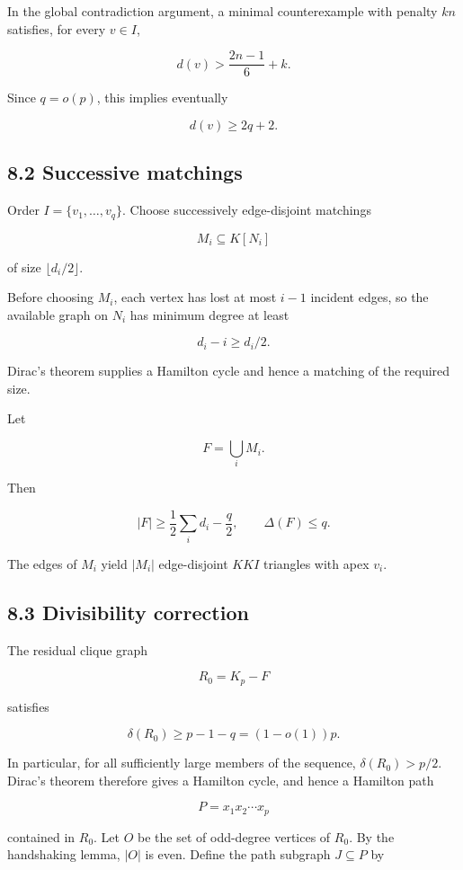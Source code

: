 \documentclass[
  11pt,
]{article}
\begin{document}
In the global contradiction argument, a minimal counterexample with
penalty \(kn\) satisfies, for every \(v\in I\),

\[
d(v)>
\frac{2n-1}{6}+k.
\tag{8.1}
\]

Since \(q=o(p)\), this implies eventually

\[
d(v)\ge2q+2.
\tag{8.2}
\]

\subsection{8.2 Successive matchings}\label{successive-matchings}

Order \(I=\{v_1,\ldots,v_q\}\). Choose successively edge-disjoint
matchings

\[
M_i\subseteq K[N_i]
\]

of size \(\lfloor d_i/2\rfloor\).

Before choosing \(M_i\), each vertex has lost at most \(i-1\) incident
edges, so the available graph on \(N_i\) has minimum degree at least

\[
d_i-i\ge d_i/2.
\]

Dirac's theorem supplies a Hamilton cycle and hence a matching of the
required size.

Let

\[
F=\bigcup_iM_i.
\]

Then

\[
|F|
\ge
\frac12\sum_i d_i-\frac q2,
\qquad
\Delta(F)\le q.
\tag{8.3}
\]

The edges of \(M_i\) yield \(|M_i|\) edge-disjoint \(KKI\) triangles
with apex \(v_i\).

\subsection{8.3 Divisibility correction}\label{divisibility-correction}

The residual clique graph

\[
R_0=K_p-F
\]

satisfies

\[
\delta(R_0)
\ge
p-1-q
=(1-o(1))p.
\tag{8.4}
\]

In particular, for all sufficiently large members of the sequence,
\(\delta(R_0)>p/2\). Dirac's theorem therefore gives a Hamilton cycle,
and hence a Hamilton path

\[
P=x_1x_2\cdots x_p
\]

contained in \(R_0\). Let \(O\) be the set of odd-degree vertices of
\(R_0\). By the handshaking lemma, \(|O|\) is even. Define the path
subgraph \(J\subseteq P\) by
\end{document}
